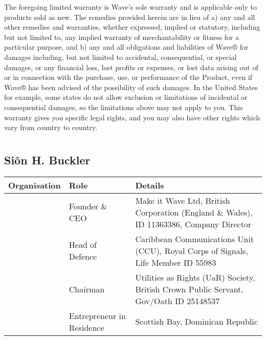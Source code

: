 \documentclass[letterpaper,10pt,english]{sphinxmanual}
\begin{document}
The foregoing limited warranty is Wave’s sole warranty and is applicable only to products sold as new. The remedies provided herein are in lieu of a) any and all other remedies and warranties, whether expressed, implied or statutory, including but not limited to, any implied warranty of merchantability or fitness for a particular purpose, and b) any and all obligations and liabilities of Wave® for damages including, but not limited to accidental, consequential, or special damages, or any financial loss, lost profits or expenses, or lost data arising out of or in connection with the purchase, use, or performance of the Product, even if Wave® has been advised of the possibility of such damages. In the United States for example, some states do not allow exclusion or limitations of incidental or consequential damages, so the limitations above may not apply to you. This warranty gives you specific legal rights, and you may also have other rights which vary from country to country.


\chapter{}
\label{\detokenize{index:document-author-s}}

\section{Siôn H. Buckler}
\label{\detokenize{index:sion-h-buckler}}

\begin{savenotes}\sphinxattablestart
\centering
\begin{tabulary}{\linewidth}[t]{|T|T|T|}
\hline
\sphinxstyletheadfamily 
Organisation
&\sphinxstyletheadfamily 
Role
&\sphinxstyletheadfamily 
Details
\\
\hline
\noindent{}
&
Founder \& CEO
&
Make it Wave Ltd, British Corporation (England \& Wales), ID 11363386, Company Director
\\
\hline
\noindent{}
&
Head of Defence
&
Caribbean Communications Unit (CCU), Royal Corps of Signals, Life Member ID 55983
\\
\hline
\noindent{}
&
Chairman
&
Utilities as Rights (UaR) Society, British Crown Public Servant, Gov/Oath ID 25148537
\\
\hline
\noindent{}
&
Entrepreneur in Residence
&
Scottish Bay, Dominican Republic
\\
\hline
\end{tabulary}
\par
\sphinxattableend\end{savenotes}
\end{document}
